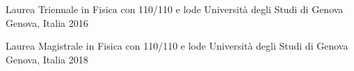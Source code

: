 




\begin{cvhonors}


\cvhonor
{Laurea Triennale in Fisica con 110/110 e lode} %
{Università degli Studi di Genova} %
{Genova, Italia} %
{2016} %


\cvhonor
{Laurea Magistrale in Fisica con 110/110 e lode} %
{Università degli Studi di Genova} %
{Genova, Italia} %
{2018} %


\end{cvhonors}

